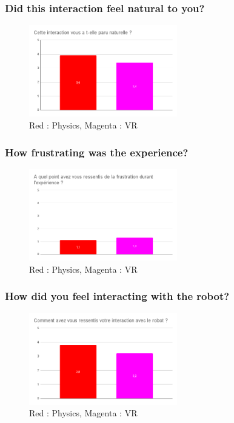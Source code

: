     
    \subsubsection{Did this interaction feel natural to you?}
    \begin{figure}[!h]
    \centering
    \includegraphics[height=4cm]{Datas/interaction_naturelle.png}
    \caption{Red : Physics, Magenta : VR}
    \end{figure}
    \vspace*{0.5cm}
    \newpage
    
    \subsubsection{How frustrating was the experience?}
    \begin{figure}[!h]
    \centering
    \includegraphics[height=4cm]{Datas/frustration.png}
    \caption{Red : Physics, Magenta : VR}
    \end{figure}
    \vspace*{0.5cm}

    \subsubsection{How did you feel interacting with the robot?}
    \begin{figure}[!h]
    \centering
    \includegraphics[height=4cm]{Datas/ressenti_interaction.png}
    \caption{Red : Physics, Magenta : VR}
    \end{figure}
    \vspace*{0.5cm}


